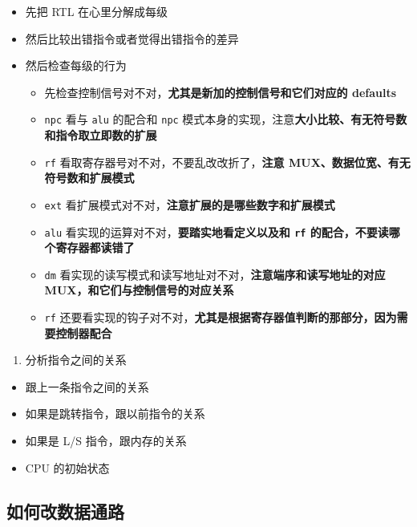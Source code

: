 \documentclass[12pt,AutoFakeBold,AutoFakeSlant]{article}
\providecommand{\tightlist}{%
  \setlength{\itemsep}{0pt}\setlength{\parskip}{0pt}}
\begin{document}
\begin{itemize}
\tightlist
\item
  先把 RTL 在心里分解成每级
\item
  然后比较出错指令或者觉得出错指令的差异
\item
  然后检查每级的行为

  \begin{itemize}
  \tightlist
  \item
    先检查控制信号对不对，\textbf{尤其是新加的控制信号和它们对应的
    defaults}
  \item
    \texttt{npc} 看与 \texttt{alu} 的配合和 \texttt{npc}
    模式本身的实现，注意\textbf{大小比较、有无符号数和指令取立即数的扩展}
  \item
    \texttt{rf} 看取寄存器号对不对，不要乱改改折了，\textbf{注意
    MUX、数据位宽、有无符号数和扩展模式}
  \item
    \texttt{ext}
    看扩展模式对不对，\textbf{注意扩展的是哪些数字和扩展模式}
  \item
    \texttt{alu} 看实现的运算对不对，\textbf{要踏实地看定义以及和
    \texttt{rf} 的配合，不要读哪个寄存器都读错了}
  \item
    \texttt{dm}
    看实现的读写模式和读写地址对不对，\textbf{注意端序和读写地址的对应
    MUX，和它们与控制信号的对应关系}
  \item
    \texttt{rf}
    还要看实现的钩子对不对，\textbf{尤其是根据寄存器值判断的那部分，因为需要控制器配合}
  \end{itemize}
\end{itemize}

\begin{enumerate}
\def\labelenumi{\arabic{enumi}.}
\setcounter{enumi}{2}
\tightlist
\item
  分析指令之间的关系
\end{enumerate}

\begin{itemize}
\tightlist
\item
  跟上一条指令之间的关系
\item
  如果是跳转指令，跟以前指令的关系
\item
  如果是 L/S 指令，跟内存的关系
\item
  CPU 的初始状态
\end{itemize}

\hypertarget{ux5982ux4f55ux6539ux6570ux636eux901aux8def}{%
\subsection{如何改数据通路}\label{ux5982ux4f55ux6539ux6570ux636eux901aux8def}}
\end{document}
